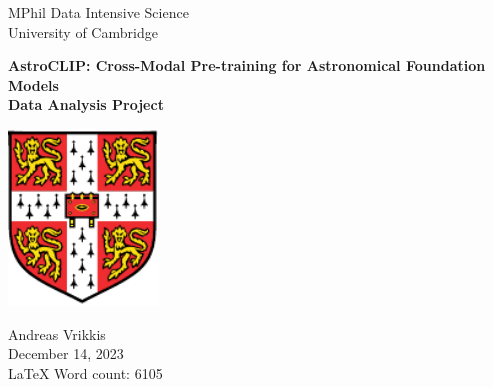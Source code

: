 \documentclass[a4paper,12pt]{article}
\begin{document}
    
    \vspace*{3cm}
    
    \begin{center}
     {\Large MPhil Data Intensive Science}  \\ [3pt]
     {\Large University of Cambridge}  \\ [3pt]
     
     \vspace*{1cm}
     \hrulefill
     \vspace*{0.75cm}
     
     {\LARGE \textbf{AstroCLIP: Cross-Modal Pre-training for Astronomical Foundation Models}} \\ [6pt]
     \large \textbf{Data Analysis Project} \\ [6pt]
     \vspace*{0.05cm}
     \hrulefill
     \vspace*{1.5cm}

    \includegraphics[width=0.3\textwidth]{../figures/University_Crest.pdf} 

    \vspace*{1.5cm}
     
     {\Large  Andreas Vrikkis} \\ [6pt]
     {\large  December 14, 2023} \\ [3pt]
     {\large  \LaTeX \hspace{0.03cm} Word count: 6105 } \\ [3pt]
     
     \end{center}   
    
    
    \newpage
    
    \restoregeometry
    
\end{document}
